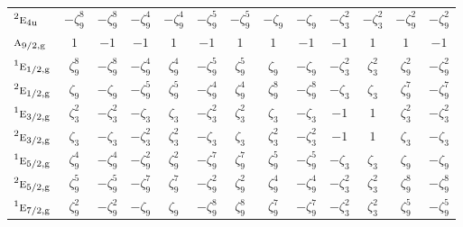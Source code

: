 \documentclass[10pt,a4paper]{article}
\makeatletter
\def\grouprule#1#2{\noalign{\marks\LTgroupmarks{\the\belowrulesep}\nobreak\vskip#1%
  \vskip\aboverulesep}\multispan\LT@cols\unskip{\leaders\hrule\@height#2\hfill\kern\z@}\cr
  \noalign{\penalty\LTrulebreak\vskip\belowrulesep\global\@lastruleclass\z@}}
\numberwithin{equation}{section}
\newcommand{\irr}[1]{\text{\normalfont\scshape #1}}
\newcommand{\conjpair}[1]{{}^{#1}}
\newcommand{\ptag}[1]{\mathrm{#1}}
\newcommand{\rootunity}[1]{\zeta_{#1}}
\makeatother
\begin{document}
{\begin{longtable}{@{}lcccccccccccc@{}}
$\conjpair{2}\irr{e}_{4\ptag{u}}$ & $-\rootunity{9}^{8}$ & $-\rootunity{9}^{8}$ & $-\rootunity{9}^{4}$ & $-\rootunity{9}^{4}$ & $-\rootunity{9}^{5}$ & $-\rootunity{9}^{5}$ & $-\rootunity{9}$ & $-\rootunity{9}$ & $-\rootunity{3}^{2}$ & $-\rootunity{3}^{2}$ & $-\rootunity{9}^{2}$ & $-\rootunity{9}^{2}$\\
\grouprule{0pt}{\lightrulewidth}
$\irr{a}_{9/2,\ptag{g}}$ & $1$ & $-1$ & $-1$ & $1$ & $-1$ & $1$ & $1$ & $-1$ & $-1$ & $1$ & $1$ & $-1$\\
$\conjpair{1}\irr{e}_{1/2,\ptag{g}}$ & $\rootunity{9}^{8}$ & $-\rootunity{9}^{8}$ & $-\rootunity{9}^{4}$ & $\rootunity{9}^{4}$ & $-\rootunity{9}^{5}$ & $\rootunity{9}^{5}$ & $\rootunity{9}$ & $-\rootunity{9}$ & $-\rootunity{3}^{2}$ & $\rootunity{3}^{2}$ & $\rootunity{9}^{2}$ & $-\rootunity{9}^{2}$\\
$\conjpair{2}\irr{e}_{1/2,\ptag{g}}$ & $\rootunity{9}$ & $-\rootunity{9}$ & $-\rootunity{9}^{5}$ & $\rootunity{9}^{5}$ & $-\rootunity{9}^{4}$ & $\rootunity{9}^{4}$ & $\rootunity{9}^{8}$ & $-\rootunity{9}^{8}$ & $-\rootunity{3}$ & $\rootunity{3}$ & $\rootunity{9}^{7}$ & $-\rootunity{9}^{7}$\\
$\conjpair{1}\irr{e}_{3/2,\ptag{g}}$ & $\rootunity{3}^{2}$ & $-\rootunity{3}^{2}$ & $-\rootunity{3}$ & $\rootunity{3}$ & $-\rootunity{3}^{2}$ & $\rootunity{3}^{2}$ & $\rootunity{3}$ & $-\rootunity{3}$ & $-1$ & $1$ & $\rootunity{3}^{2}$ & $-\rootunity{3}^{2}$\\
$\conjpair{2}\irr{e}_{3/2,\ptag{g}}$ & $\rootunity{3}$ & $-\rootunity{3}$ & $-\rootunity{3}^{2}$ & $\rootunity{3}^{2}$ & $-\rootunity{3}$ & $\rootunity{3}$ & $\rootunity{3}^{2}$ & $-\rootunity{3}^{2}$ & $-1$ & $1$ & $\rootunity{3}$ & $-\rootunity{3}$\\
$\conjpair{1}\irr{e}_{5/2,\ptag{g}}$ & $\rootunity{9}^{4}$ & $-\rootunity{9}^{4}$ & $-\rootunity{9}^{2}$ & $\rootunity{9}^{2}$ & $-\rootunity{9}^{7}$ & $\rootunity{9}^{7}$ & $\rootunity{9}^{5}$ & $-\rootunity{9}^{5}$ & $-\rootunity{3}$ & $\rootunity{3}$ & $\rootunity{9}$ & $-\rootunity{9}$\\
$\conjpair{2}\irr{e}_{5/2,\ptag{g}}$ & $\rootunity{9}^{5}$ & $-\rootunity{9}^{5}$ & $-\rootunity{9}^{7}$ & $\rootunity{9}^{7}$ & $-\rootunity{9}^{2}$ & $\rootunity{9}^{2}$ & $\rootunity{9}^{4}$ & $-\rootunity{9}^{4}$ & $-\rootunity{3}^{2}$ & $\rootunity{3}^{2}$ & $\rootunity{9}^{8}$ & $-\rootunity{9}^{8}$\\
$\conjpair{1}\irr{e}_{7/2,\ptag{g}}$ & $\rootunity{9}^{2}$ & $-\rootunity{9}^{2}$ & $-\rootunity{9}$ & $\rootunity{9}$ & $-\rootunity{9}^{8}$ & $\rootunity{9}^{8}$ & $\rootunity{9}^{7}$ & $-\rootunity{9}^{7}$ & $-\rootunity{3}^{2}$ & $\rootunity{3}^{2}$ & $\rootunity{9}^{5}$ & $-\rootunity{9}^{5}$\\

\end{longtable}}
\end{document}

